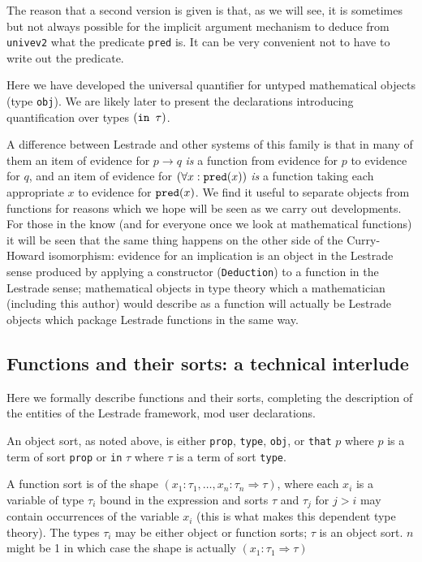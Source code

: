 \documentclass[12pt]{article}
\begin{document}
The reason that a second version is given is that, as we will see, it is sometimes but not always possible for the implicit argument mechanism to deduce from {\tt univev2} what the predicate {\tt pred} is.  It can be very convenient not to have to write out the predicate.

Here we have developed the universal quantifier for untyped mathematical objects (type {\tt obj}).  We are likely later to present the declarations introducing quantification over types $({\tt in} \verb| | \tau)$.

A difference between Lestrade and other systems of this family is that in many of them an item of evidence for $p \rightarrow q$
{\em is\/} a function from evidence for $p$ to evidence for $q$, and an item of evidence for $(\forall x:{\tt pred}(x))$ {\em is\/}
a function taking each appropriate $x$ to evidence for ${\tt pred}(x)$.  We find it useful to separate objects from functions for reasons which we hope will be seen as we carry out developments.  For those in the know (and for everyone once we look at mathematical functions) it will be seen that the same thing happens on the other side of the Curry-Howard isomorphism:  evidence for an implication is an object in the Lestrade sense produced by applying a constructor ({\tt Deduction}) to a function in the Lestrade sense;  mathematical objects in type theory which a mathematician (including this author) would describe as a function will actually be Lestrade objects which package Lestrade functions in the same way.



\newpage

\subsection{Functions and their sorts:  a technical interlude}

Here we formally describe functions and their sorts, completing the description of the entities of the Lestrade framework, mod user declarations.

An object sort, as noted above, is either {\tt prop}, {\tt type}, {\tt obj}, or {\tt that} $p$ where $p$ is a term of sort {\tt prop} or {\tt in} $\tau$ where $\tau$ is a term of sort {\tt type}.

A function sort is of the shape $(x_1:\tau_1,\ldots,x_n:\tau_n\Rightarrow \tau)$, where each $x_i$ is a variable of type $\tau_i$
bound in the expression and sorts $\tau$ and $\tau_j$ for $j>i$ may contain occurrences of the variable $x_i$ (this is what makes this dependent type theory).  The types $\tau_i$ may be either object or function sorts;  $\tau$ is an object sort.  $n$ might be 1 in which case the shape is actually $(x_1:\tau_1\Rightarrow \tau)$
\end{document}
